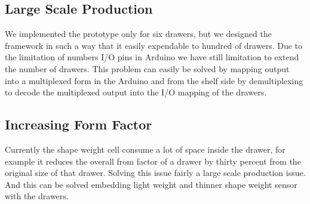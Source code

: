 \subsection{Large Scale Production}
We implemented the prototype only for six drawers, but we designed the framework in such a way that it easily expendable to hundred of drawers. 
Due to the limitation of numbers I/O pins in Arduino we have still limitation to extend the number of drawers. 
This problem can easily be solved by mapping output into a multiplexed form in the Arduino and from the shelf side by demultiplexing to decode the multiplexed output into the I/O mapping of the drawers. 

\subsection{Increasing Form Factor}
Currently the shape weight cell consume a lot of space inside the drawer, for example it reduces the overall from factor of a drawer by thirty percent from the original size of that drawer.
Solving this issue fairly a large scale production issue. And this can be solved embedding light weight and thinner shape weight sensor with the drawers.